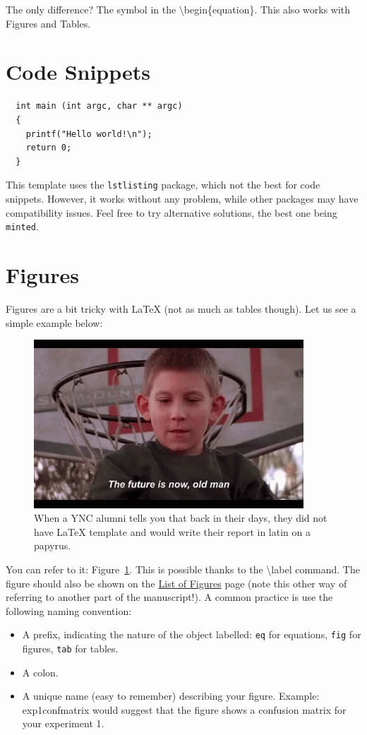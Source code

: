 The only difference? The \textasteriskcentered{}  symbol in the \textbackslash{}begin\{equation\textbf{\textasteriskcentered}\}.
This also works with Figures and Tables.

\section{Code Snippets}

\begin{lstlisting}
  int main (int argc, char ** argc)
  {
    printf("Hello world!\n");
    return 0;
  }
\end{lstlisting}

This template uses the \texttt{lstlisting} package, which not the best for code snippets.
However, it works without any problem, while other packages may have compatibility issues.
Feel free to try alternative solutions, the best one being \texttt{minted}.

\section{Figures}
Figures are a bit tricky with LaTeX {\tiny(not as much as tables though)}.
Let us see a simple example below:
\begin{figure}[!h]
  \centering
    \includegraphics[width=0.9\textwidth]{figures/future.png}
  \caption{When a YNC alumni tells you that back in their days, they did not have LaTeX template and would write their report in latin on a papyrus.}
  \label{fig:future}
\end{figure}
You can refer to it: Figure~\ref{fig:future}.
This is possible thanks to the \textbackslash{}label command.
The figure should also be shown on the \hyperref[lst:figs]{List of Figures} page (note this other way of referring to another part of the manuscript!).
A common practice is use the following naming convention:
\begin{itemize}
  \item A prefix, indicating the nature of the object labelled: \texttt{eq} for equations, \texttt{fig} for figures, \texttt{tab} for tables.
  \item A colon.
  \item A unique name (easy to remember) describing your figure. Example: exp1confmatrix would suggest that the figure shows a confusion matrix for your experiment 1.
\end{itemize}

